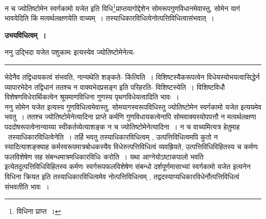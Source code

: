\documentclass[11pt, openany]{book}
\makeatletter
\def\blfootnote{\gdef\@thefnmark{}\@footnotetext}
\makeatother
\begin{document}
 \blfootnote{पाठा०\textemdash\ $^{१}$विशिष्टस्यैकस्यैव~।}
{\bl न च {\al ज्योतिष्टोमेन स्वर्गकामो यजेत} इति विधि\footnote{विधिना प्राप्त~।}प्राप्तयागोद्देशेन सोमरूपगुणविधानमेवास्तु, सोमेन यागं भावयेदिति किं मत्वर्थलक्षणयेति वाच्यम्~। तस्याधिकारविधित्वेनोत्पत्तिविधित्वासंभवात्~।}
\begin{center}
 \textbf{उभयविधित्वम्~।}
\end{center}

{\bl ननु {\qtl उद्भिदा यजेत पशुकामः} इत्यस्येव ज्योतिष्टोमेनेत्य-\\ }
\hrule
\vspace{3mm}
\noindent
भेदेनैव तद्विधायकत्वं संभवति, नान्यथेति शङ्कते- {\br किंत्विति~।} विशिष्टस्यैकरूपत्वेन विधेयस्योभयत्वासिद्धेर्न व्यापारभेदेन तद्विधानं ततश्च न वाक्यभेदप्रसङ्ग इति परिहरति- {\br विशिष्टस्येति~।} विशिष्टविधौ विशेषणविधेरार्थिकत्वेन श्रूयमाणविधिना गुणस्य पृथगविधेयत्वादिति भावः~।\\

 {\br ननु} {\qt सोमेन यजेत} इत्यस्य गुणविधित्वमेवास्तु, सोमयागस्वरूपविधिस्तु {\qt ज्योतिष्टोमेन स्वर्गकामो यजेत} इत्ययमेव भवतु~। ततश्च ज्योतिष्टोमेनेत्यादिना प्राप्ते कर्मणि गुणविधायकत्वेनापि सोमवाक्यस्योपपत्तौ न मत्वर्थलक्षणा पददोषरूपत्वेनान्याय्या स्वीकर्तव्येत्याशङ्क {\br न च ज्योतिष्टोमेनेत्यादिना~।} न च वाच्यमित्यत्र हेतुमाह \textendash\ {\br तस्याधिकारविधित्वेनेति~।} तर्हि भवतु तस्याधिकारविधित्वम् , उत्पत्तिविधित्वमपि कुतो न स्यादित्याशङ्क्याह  कर्मस्वरूपमात्रबोधकस्यैव विधेरुत्पत्तिविधित्वं व्यवह्रियते, उत्पत्तिविधिविहितस्य च कर्मणः फलविशेषेण सह संबन्धमात्रमधिकारविधिः करोति~। यथा {\qt आग्नेयोऽष्टाकपालो भवति} इत्येतदुत्पत्तिविधिविहितस्य कर्मणः स्वर्गरूपफलविशेषेण संबन्धो {\qt दर्शपूर्णमासाभ्यां स्वर्गकामो यजेत} इत्यनेन
विधिना क्रियत इति तस्याधिकारविधित्वमेव नोत्पत्तिविधित्वम् , तद्वदस्याप्यधिकारविधेर्नोत्पत्तिविधित्वं संभवतीति भावः~।\\
\end{document}
